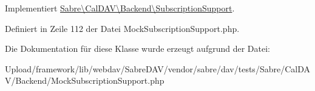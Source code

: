 Implementiert \mbox{\hyperlink{interface_sabre_1_1_cal_d_a_v_1_1_backend_1_1_subscription_support_a20f5a3472fb23eca7bde970c959dee66}{Sabre\textbackslash{}\+Cal\+D\+A\+V\textbackslash{}\+Backend\textbackslash{}\+Subscription\+Support}}.



Definiert in Zeile 112 der Datei Mock\+Subscription\+Support.\+php.



Die Dokumentation für diese Klasse wurde erzeugt aufgrund der Datei\+:\begin{DoxyCompactItemize}
\item 
Upload/framework/lib/webdav/\+Sabre\+D\+A\+V/vendor/sabre/dav/tests/\+Sabre/\+Cal\+D\+A\+V/\+Backend/Mock\+Subscription\+Support.\+php\end{DoxyCompactItemize}
